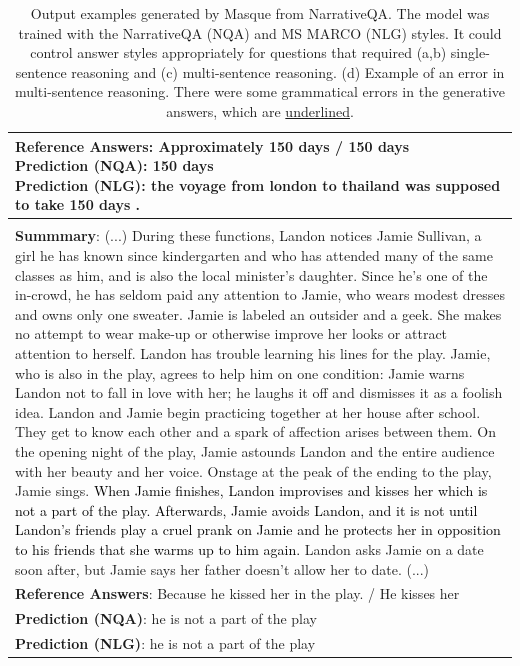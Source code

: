 \documentclass[11pt,a4paper]{article}
\newcommand{\cmark}{\ding{51}}%
\newcommand{\xmark}{\ding{55}}%
\theoremstyle{mydef}
\theoremstyle{myprob}
\begin{document}
\begin{table}[h!]
{\begin{tabular}{p{50em}}
{\textbf{Reference Answers}:  Approximately 150 days / 150 days \\
\textbf{Prediction (NQA)}: 150 days \cmark \\
\textbf{Prediction (NLG)}: the voyage from london to thailand was supposed to take 150 days . \cmark
}
\vspace{1pt}
\\ \hline
\vspace{0.5pt}
\pbox{50em}{ %
\textbf{(d) Question}: Why does Jamie start avoiding Landon? \\
\textbf{Summmary}: 
(...) During these functions, Landon notices Jamie Sullivan, a girl he has known since kindergarten and who has attended many of the same classes as him, and is also the local minister's daughter. Since he's one of the in-crowd, he has seldom paid any attention to Jamie, who wears modest dresses and owns only one sweater. Jamie is labeled an outsider and a geek. She makes no attempt to wear make-up or otherwise improve her looks or attract attention to herself. Landon has trouble learning his lines for the play. Jamie, who is also in the play, agrees to help him on one condition: Jamie warns Landon not to fall in love with her; he laughs it off and dismisses it as a foolish idea. Landon and Jamie begin practicing together at her house after school. They get to know each other and a spark of affection arises between them. On the opening night of the play, Jamie astounds Landon and the entire audience with her beauty and her voice. Onstage at the peak of the ending to the play, Jamie sings. \textcolor{black}{When Jamie finishes, Landon improvises and kisses her which is not a part of the play. Afterwards, Jamie avoids Landon, and it is not until Landon's friends play a cruel prank on Jamie and he protects her in opposition to his friends that she warms up to him again.} Landon asks Jamie on a date soon after, but Jamie says her father doesn't allow her to date. (...) \\
\textbf{Reference Answers}: Because he kissed her in the play. / He kisses her \\
\textbf{Prediction (NQA)}: he is not a part of the play \xmark \\
\textbf{Prediction (NLG)}: he is not a part of the play \xmark
}
\vspace{1pt}
\\ \hline
\end{tabular}
}
\caption{Output examples generated by Masque from NarrativeQA. The model was trained with the NarrativeQA (NQA) and MS MARCO (NLG) styles. It could control answer styles appropriately for questions that required (a,b) single-sentence reasoning
and (c) multi-sentence reasoning. (d) Example of an error in multi-sentence reasoning. There were some grammatical errors in the generative answers, which are \underline{underlined}. 
}
\label{tb:examples2}
\end{table}
\end{document}
